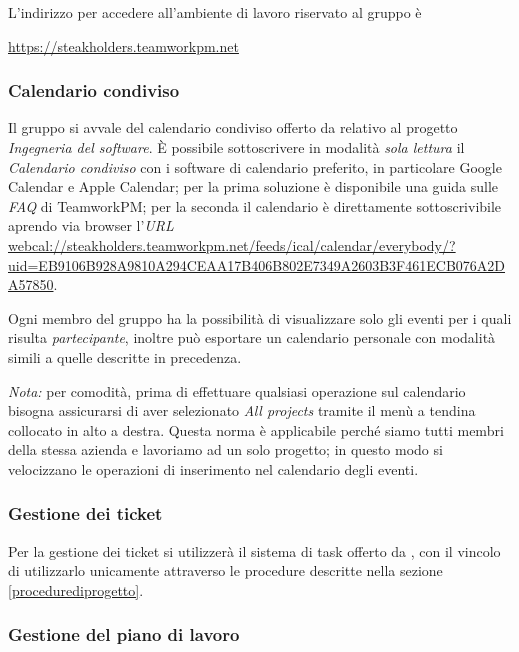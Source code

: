 		L'indirizzo per accedere all'ambiente di lavoro riservato al gruppo è
		\begin{center}
			\url{https://steakholders.teamworkpm.net}
		\end{center}
		
		\subsubsection{Calendario condiviso}
		\label{Calendario condiviso}
		
		Il gruppo si avvale del calendario condiviso offerto da  relativo al progetto \emph{Ingegneria del software}. È possibile sottoscrivere in modalità \emph{sola lettura} il \emph{Calendario condiviso} con i software di calendario preferito, in particolare Google Calendar e Apple Calendar; per la prima soluzione è disponibile una guida sulle \emph{FAQ} di TeamworkPM; per la seconda il calendario è direttamente sottoscrivibile aprendo via browser l'\emph{URL} \url{webcal://steakholders.teamworkpm.net/feeds/ical/calendar/everybody/?uid=EB9106B928A9810A294CEAA17B406B802E7349A2603B3F461ECB076A2DA57850}.
		
		Ogni membro del gruppo ha la possibilità di visualizzare solo gli eventi per i quali risulta \emph{partecipante}, inoltre può esportare un calendario personale con modalità simili a quelle descritte in precedenza.
		
		\textit{Nota:} per comodità, prima di effettuare qualsiasi operazione sul calendario bisogna assicurarsi di aver selezionato \emph{All projects} tramite il menù a tendina collocato in alto a destra. Questa norma è applicabile perché siamo tutti membri della stessa azienda e lavoriamo ad un solo progetto; in questo modo si velocizzano le operazioni di inserimento nel calendario degli eventi.
		
		\subsubsection{Gestione dei ticket}
		
		Per la gestione dei ticket si utilizzerà il sistema di task offerto da , con il vincolo di utilizzarlo unicamente attraverso le procedure descritte nella sezione \ref{procedurediprogetto}.
		
		\subsubsection{Gestione del piano di lavoro}
		
